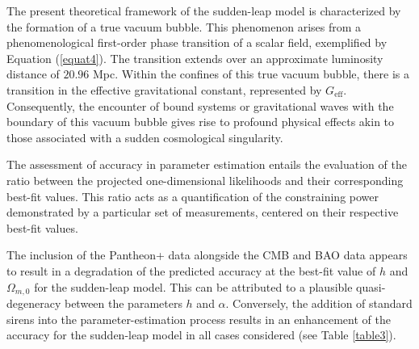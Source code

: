 \documentclass[universe,article,accept,moreauthors,pdftex]{Definitions/mdpi}
\begin{document}
The present theoretical framework  of the sudden-leap model is characterized by the formation of a true vacuum bubble. This phenomenon arises from a phenomenological first-order phase transition of a scalar field, exemplified by Equation (\ref{equat4}). The transition extends over an approximate luminosity distance of $20.96$ Mpc. Within the confines of this true vacuum bubble, there is a transition in the effective gravitational constant, represented by $G_{\text{eff}}$. Consequently, the encounter of bound systems \cite{Perivolaropoulos:2016nhp} or gravitational waves with the boundary of this vacuum bubble gives rise to profound physical effects akin to those associated with a sudden cosmological singularity.


 
 
 
 
The assessment of accuracy in parameter estimation entails the evaluation of the ratio between the projected one-dimensional likelihoods and their corresponding best-fit values. This ratio acts as a quantification of the constraining power demonstrated by a particular set of measurements, centered on their respective best-fit values. 

The inclusion of the Pantheon+ data alongside the CMB and BAO data appears to result in a degradation of the predicted accuracy at the best-fit value of $h$ and $\Omega_{m,0}$ for the sudden-leap model. This can be attributed to a plausible quasi-degeneracy between the parameters $h$ and $\alpha$. Conversely, the addition of standard sirens into the parameter-estimation process results in an enhancement of the accuracy for the sudden-leap model in all cases considered (see Table \ref{table3}). 
 
 
 
\end{document}
